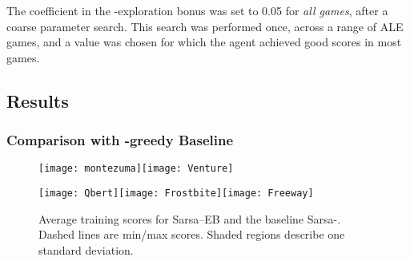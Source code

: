 \documentclass{article}
\theoremstyle{definition}
\theoremstyle{definition}
\theoremstyle{plain}
\theoremstyle{plain}
\theoremstyle{plain}
\begin{document}
The  coefficient in the -exploration bonus was set
to 0.05 for \emph{all games}, after a coarse parameter search. This
search was performed once, across a range of ALE games, and a value
was chosen for which the agent achieved good scores in most games.


\subsection{Results}


\subsubsection*{Comparison with -greedy Baseline}

\begin{figure*}
\noindent \begin{centering}
\texttt{[image: montezuma]}\texttt{[image: Venture]}
\par\end{centering}

\noindent \begin{centering}
\texttt{[image: Qbert]}\texttt{[image: Frostbite]}\texttt{[image: Freeway]}
\par\end{centering}

\caption{Average training scores for Sarsa--EB and the baseline Sarsa-.
Dashed lines are min/max scores. Shaded regions describe one standard
deviation.\label{fig:Average-training-scores}}
\end{figure*}
\end{document}
